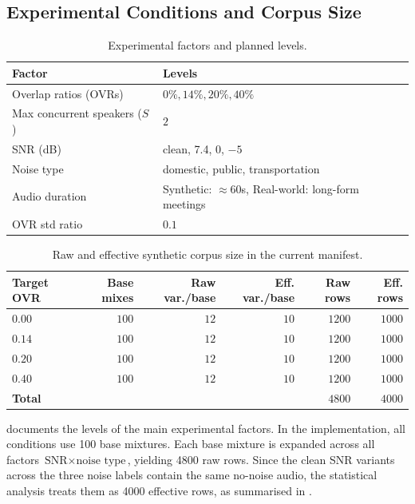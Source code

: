 \subsection{Experimental Conditions and Corpus Size}
\begin{table}[ht]
\centering
\caption{Experimental factors and planned levels.}
\label{tab:design_factors}
\begin{tabularx}{\textwidth}{lX}
\toprule
\textbf{Factor} & \textbf{Levels} \\
\midrule
Overlap ratios (OVRs) & $0\%, 14\%, 20\%, 40\%$ \\
Max concurrent speakers ($S$) & $2$ \\
SNR (dB) & clean, 7.4, 0, $-5$ \\
Noise type & domestic,  public, transportation\\
Audio duration & Synthetic: $\approx$60s, Real-world: long-form meetings\\
OVR std ratio & $0.1$ \\
\bottomrule
\end{tabularx}
\end{table}
\begin{table}[ht]
\centering
\caption{Raw and effective synthetic corpus size in the current manifest.}
\label{tab:synthetic_counts}
\small
\setlength{\tabcolsep}{4pt}
\begin{tabular}{lrrrrr}
\toprule
\textbf{Target OVR} & \textbf{Base mixes} & \textbf{Raw var./base} & \textbf{Eff. var./base} & \textbf{Raw rows} & \textbf{Eff. rows} \\
\midrule
$0.00$ & $100$ & $12$ & $10$ & $1200$ & $1000$ \\
$0.14$ & $100$ & $12$ & $10$ & $1200$ & $1000$ \\
$0.20$ & $100$ & $12$ & $10$ & $1200$ & $1000$ \\
$0.40$ & $100$ & $12$ & $10$ & $1200$ & $1000$ \\
\midrule
\textbf{Total} &  &  &  & \textbf{$4800$} & \textbf{$4000$} \\
\bottomrule
\end{tabular}
\setlength{\tabcolsep}{6pt}
\normalsize
\end{table}
 documents the levels of the main experimental factors. In the implementation, all conditions use 100 base mixtures. Each base mixture is expanded across all factors $\text{SNR} \times \text{noise type}$, yielding 4800 raw rows. Since the clean SNR variants across the three noise labels contain the same no-noise audio, the statistical analysis treats them as 4000 effective rows, as summarised in .

